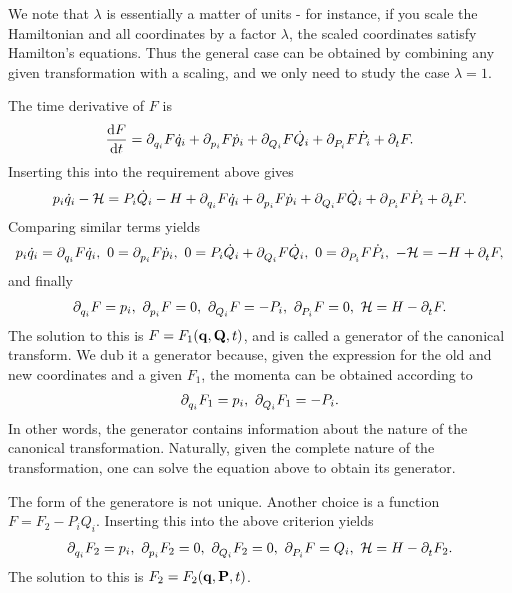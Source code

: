 We note that $\lambda$ is essentially a matter of units - for instance, if you scale the Hamiltonian and all coordinates by a factor $\lambda$, the scaled coordinates satisfy Hamilton's equations. Thus the general case can be obtained by combining any given transformation with a scaling, and we only need to study the case $\lambda = 1$.

The time derivative of $F$ is
\begin{align*}
	\dv{F}{t} = \partial^{}_{q_{i}}F\dot{q}_{i} + \partial^{}_{p_{i}}F\dot{p}_{i} + \partial^{}_{Q_{i}}F\dot{Q}_{i} + \partial^{}_{P_{i}}F\dot{P}_{i} + \partial^{}_{t}F.
\end{align*}
Inserting this into the requirement above gives
\begin{align*}
	p_{i}\dot{q}_{i} - \mathcal{H} = P_{i}\dot{Q}_{i} - H + \partial^{}_{q_{i}}F\dot{q}_{i} + \partial^{}_{p_{i}}F\dot{p}_{i} + \partial^{}_{Q_{i}}F\dot{Q}_{i} + \partial^{}_{P_{i}}F\dot{P}_{i} + \partial^{}_{t}F.
\end{align*}
Comparing similar terms yields
\begin{align*}
	p_{i}\dot{q}_{i} = \partial^{}_{q_{i}}F\dot{q}_{i},\ 0 = \partial^{}_{p_{i}}F\dot{p}_{i},\ 0 = P_{i}\dot{Q}_{i} + \partial^{}_{Q_{i}}F\dot{Q}_{i},\ 0 = \partial^{}_{P_{i}}F\dot{P}_{i},\ -\mathcal{H} = -H + \partial^{}_{t}F, 
\end{align*}
and finally
\begin{align*}
	\partial^{}_{q_{i}}F = p_{i},\ \partial^{}_{p_{i}}F = 0,\ \partial^{}_{Q_{i}}F = -P_{i},\ \partial^{}_{P_{i}}F = 0,\ \mathcal{H} = H - \partial^{}_{t}F.
\end{align*}
The solution to this is $F = F_{1}(\vb{q}, \vb{Q}, t)$, and is called a generator of the canonical transform. We dub it a generator because, given the expression for the old and new coordinates and a given $F_{1}$, the momenta can be obtained according to
\begin{align*}
	\partial^{}_{q_{i}}F_{1} = p_{i},\ \partial^{}_{Q_{i}}F_{1} = -P_{i}.
\end{align*}
In other words, the generator contains information about the nature of the canonical transformation. Naturally, given the complete nature of the transformation, one can solve the equation above to obtain its generator.

The form of the generatore is not unique. Another choice is a function $F = F_{2} - P_{i}Q_{i}$. Inserting this into the above criterion yields
\begin{align*}
	\del{q_{i}}{F_{2}} = p_{i},\ \del{p_{i}}{F_{2}} = 0,\ \del{Q_{i}}{F_{2}} = 0,\ \del{P_{i}}{F} = Q_{i},\ \ham = H - \del{t}{F_{2}}.
\end{align*}
The solution to this is $F_{2} = F_{2}(\vb{q}, \vb{P}, t)$.

